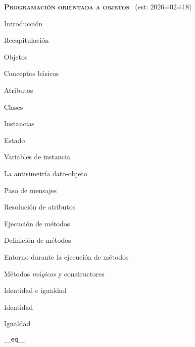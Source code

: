 \begin{longenum}
    \item \textbf{\textsc{Programación orientada a objetos}} \ (est: 2026\==02\==18)
    \begin{longenum}
        \item Introducción
        \begin{longenum}
            \item Recapitulación
            \item Objetos
        \end{longenum}
        \item Conceptos básicos
        \begin{longenum}
            \item Atributos
            \item Clases
            \begin{longenum}
                \item Instancias
            \end{longenum}
            \item Estado
            \begin{longenum}
                \item Variables de instancia
            \end{longenum}
            \item La antisimetría dato-objeto
        \end{longenum}
        \item Paso de mensajes
        \begin{longenum}
            \item Resolución de atributos
            \item Ejecución de métodos
            \item Definición de métodos
            \begin{longenum}
                \item Entorno durante la ejecución de métodos
            \end{longenum}
            \item Métodos \textit{mágicos} y constructores
        \end{longenum}
        \item Identidad e igualdad
        \begin{longenum}
            \item Identidad
            \item Igualdad
            \begin{longenum}
                \item \texttt{\_\_eq\_\_}

\end{longenum}
\end{longenum}
\end{longenum}
\end{longenum}
